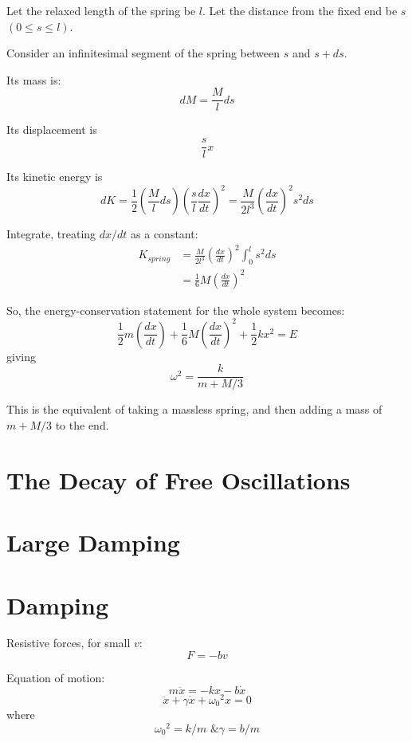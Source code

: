 \documentclass[11pt,letterpaper,titlepage,oneside]{book}
\begin{document}
Let the relaxed length of the spring be $l$. Let the distance from the fixed end be $s$ $(0 \leq s \leq l)$. 

Consider an infinitesimal segment of the spring between $s$ and $s + ds$.

Its mass is: \[ dM = \frac{M}{l} ds \] 

Its displacement is \[ \frac{s}{l} x \]

Its kinetic energy is \[ dK = \frac{1}{2}\left( \frac{M}{l} ds \right) \left( \frac{s}{l} \frac{dx}{dt} \right)^2 = \frac{M}{2l^3} \left( \frac{dx}{dt} \right)^2 s^2 ds \]

Integrate, treating $dx/dt$ as a constant:
\begin{align*}
K_{spring} &= \frac{M}{2l^3} \left( \frac{dx}{dt} \right)^2  \int_0^{l} s^2 ds \\
&= \frac{1}{6}M\left(\frac{dx}{dt}\right)^2
\end{align*}

So, the energy-conservation statement for the whole system becomes:
\[ \frac{1}{2}m\left(\frac{dx}{dt}\right) + \frac{1}{6}M\left( \frac{dx}{dt}\right)^2 + \frac{1}{2}kx^2 = E \]
giving
\[ \omega^2 = \frac{k}{m + M/3} \]

This is the equivalent of taking a massless spring, and then adding a mass of $m + M/3$ to the end.


\section{The Decay of Free Oscillations}

\section{Large Damping}


\section{Damping}
Resistive forces, for small $v$: \[ F=-bv \]

Equation of motion:
\[ m\ddot{x} = -kx - b\dot{x} \]
\[ \ddot{x} + \gamma \dot{x} + {\omega_0}^2 x = 0 \]
where
\[ {\omega_0}^2 = k/m \text{ \& } \gamma = b/m \]
\end{document}
